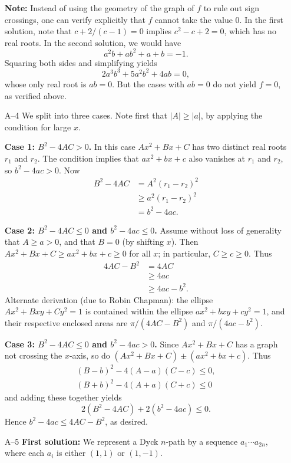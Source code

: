 \documentclass[amssymb,twocolumn,pra,10pt,aps]{revtex4-1}
\begin{document}
\begin{itemize}
\textbf{Note:} Instead of using the geometry of the graph of $f$ to rule
out sign crossings, one can verify explicitly that $f$ cannot
take the value 0. In the first solution, note that $c + 2/(c-1)=0$
implies $c^2 - c + 2 = 0$, which has no real roots.
In the second solution, we would have
\[
a^2 b + ab^2 + a + b =  -1.
\]
Squaring both sides and simplifying yields
\[
2a^3b^3 + 5a^2b^2 + 4ab = 0,
\]
whose only real root is $ab=0$. But the cases with $ab=0$ do not yield
$f=0$, as verified above.

\item[A--4]
We split into three cases.
Note first that $|A| \geq |a|$, by applying the condition for large $x$.

\textbf{Case 1: $B^2 - 4AC > 0$.}
In this case $Ax^2 + Bx + C$ has two distinct real roots $r_1$ and $r_2$.
The condition implies that $ax^2 + bx + c$ also vanishes at $r_1$ and $r_2$,
so $b^2 - 4ac > 0$.
Now
\begin{align*}
B^2 - 4AC &= A^2(r_1-r_2)^2 \\
&\geq a^2(r_1 - r_2)^2 \\
&= b^2 - 4ac.
\end{align*}

\textbf{Case 2: $B^2 - 4AC \leq 0$ and $b^2 - 4ac \leq 0$.}
Assume without loss of generality that $A \geq a > 0$, and that $B=0$
(by shifting $x$). Then $Ax^2 + Bx + C \geq ax^2 + bx + c \geq 0$ for all $x$;
in particular, $C \geq c \geq 0$. Thus
\begin{align*}
4AC - B^2 &= 4AC \\
&\geq 4ac \\
&\geq 4ac - b^2.
\end{align*}
Alternate derivation (due to Robin Chapman): the ellipse
$Ax^2 + Bxy + Cy^2 = 1$ is contained within
the ellipse $ax^2 + bxy + cy^2 = 1$,
and their respective enclosed areas are $\pi/(4AC-B^2)$ and
$\pi/(4ac-b^2)$.

\textbf{Case 3: $B^2 - 4AC \leq 0$ and $b^2 - 4ac > 0$.}
Since $Ax^2 + Bx + C$ has a graph not crossing the $x$-axis,
so do $(Ax^2 + Bx + C) \pm (ax^2 + bx + c)$. Thus
\begin{gather*}
(B-b)^2 - 4(A-a)(C-c) \leq 0, \\
(B+b)^2 - 4(A+a)(C+c) \leq 0
\end{gather*}
and adding these together yields
\[
2(B^2 - 4AC) + 2(b^2 - 4ac) \leq 0.
\]
Hence $b^2 - 4ac \leq 4AC - B^2$, as desired.

\item[A--5]
\textbf{First solution:}
We represent a Dyck $n$-path by a sequence $a_1\cdots a_{2n}$, where
each $a_i$ is either $(1,1)$ or $(1,-1)$.


\end{itemize}
\end{document}
